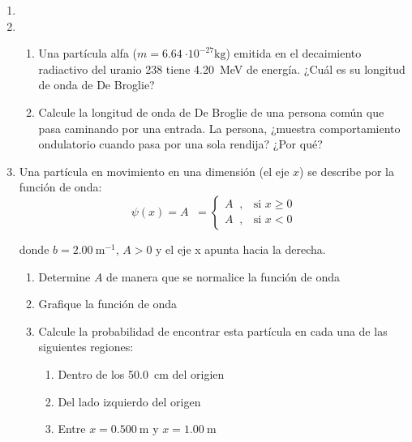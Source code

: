 \documentclass[letterpaper,11pt]{article}
\begin{document}
\vspace{-1cm}
\begin{enumerate}\setlength{\itemsep}{0.4cm}


\item[]

\item 
    \begin{enumerate}
        \item Una partícula alfa ($m = \SI{6.64}{\cdot 10^{-27}\kg}$) emitida en el decaimiento radiactivo del uranio 238 tiene \SI{4.20}{\mega\eV} de energía. ¿Cuál es su longitud de onda de De Broglie?
        
        \item Calcule la longitud de onda de De Broglie de una persona común que pasa caminando por una entrada. La persona, ¿muestra comportamiento ondulatorio cuando pasa por una sola rendija? ¿Por qué?
    \end{enumerate}

\item Una partícula en movimiento en una dimensión (el eje $x$) se describe por la función de onda:
\[\psi(x) = A \mathop{e^{-b|x|}} = 
\begin{cases}
    A\mathop{e^{-bx}}, & \text{si } x \geq 0\\
    A\mathop{e^{bx}}, & \text{si } x<0
\end{cases}\] 

donde $b = \SI{2.00}{\m^{-1}}$, $A>0$ y el eje x apunta hacia la derecha.
    \begin{enumerate}
        \item Determine $A$ de manera que se normalice la función de onda
        
        \item Grafique la función de onda
        
        \item Calcule la probabilidad de encontrar esta partícula en cada una de las siguientes regiones:
            \begin{enumerate}
                \item Dentro de los \SI{50.0}{\cm} del origien
                
                \item Del lado izquierdo del origen
                
                \item Entre $x = \SI{0.500}{\m}$ y $x = \SI{1.00}{\m}$
            \end{enumerate}
    \end{enumerate}
    

\end{enumerate}
\end{document}
